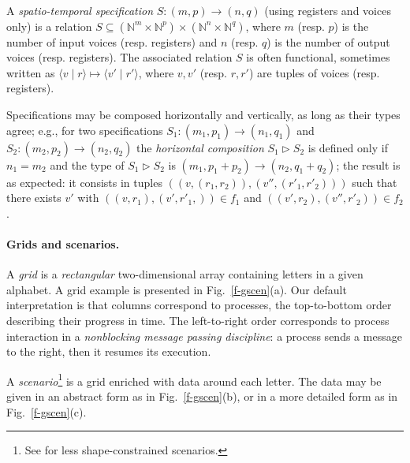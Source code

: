 \documentclass[runningheads]{llncs}
\newcommand{\1}{\u{a}}
\newcommand{\2}{\c{s}}
\newcommand{\5}{\c{t}}
\newcommand{\8}{\^{\i}}
\newcommand{\9}{\^{a}}
\newcommand{\foo}[1]{\footnote{#1}}
\newcommand{\ra}{\rightarrow}
\newcommand{\hcomp}{\triangleright}
\newcommand{\stdata}[2]{\langle #1 \;|\; #2 \rangle}
\begin{document}
A {\em spatio-temporal specification} $S:(m,p)\ra (n,q)$ (using registers and voices only) is a relation
$S\subseteq (\mathbb{N}^m \times \mathbb{N}^p) \times(\mathbb{N}^n \times\mathbb{N}^q)$, where $m$ (resp. $p$)
is the number of input voices (resp. registers) and $n$ (resp. $q$) is the number of output voices
(resp. registers).  The associated relation $S$ is often functional, sometimes written as $\stdata{v}{r}
\mapsto \stdata{v'}{r'}$, where $v,v'$ (resp. $r,r'$) are tuples of voices (resp. registers).

Specifications may be composed horizontally and vertically, as long as their types agree; e.g., for two
specifications $S_1:(m_1,p_1)\ra (n_1,q_1)$ and $S_2:(m_2,p_2)\ra (n_2,q_2)$ the {\em horizontal composition}
$S_1\hcomp S_2$ is defined only if $n_1=m_2$ and the type of $S_1\hcomp S_2$ is $(m_1,p_1+p_2)\ra
(n_2,q_1+q_2)$; the result is as expected: it consists in tuples $((v,(r_1,r_2)),(v'',(r'_1,r'_2)))$ such that
there exists $v'$ with $((v,r_1),(v',r'_1,))\in f_1$ and $((v',r_2),(v'',r'_2))\in f_2$.

\paragraph{Grids and scenarios.}

A {\em grid} is a {\em rectangular} two-dimensional array containing letters in a given alphabet.  A grid
example is presented in Fig.~\ref{f-gscen}(a). Our default interpretation is that columns correspond to
processes, the top-to-bottom order describing their progress in time. The left-to-right order corresponds to
process interaction in a {\em nonblocking message passing discipline}: a process sends a message to the right,
then it resumes its execution.

A {\em scenario}\foo{See \cite{ha-ma03} for less shape-constrained scenarios.} is a grid enriched with data
around each letter. The data may be given in an abstract form as in Fig.~\ref{f-gscen}(b), or in a more
detailed form as in Fig.~\ref{f-gscen}(c).
\end{document}
